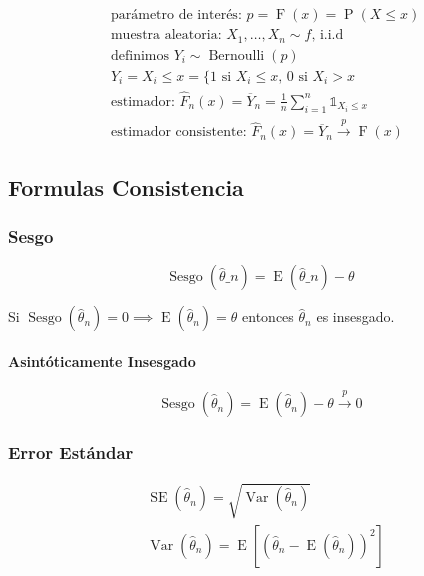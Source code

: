 \documentclass[
]{article}
\begin{document}
\[
\begin{align*}
    & \text{parámetro de interés: } p = \operatorname{F}(x) = \operatorname{P}(X \leq x) \\
    & \text{muestra aleatoria: } X_1, \dots, X_n \sim f \text{, i.i.d} \\
    & \text{definimos } Y_i \sim \operatorname{Bernoulli}(p) \\
    & Y_i = X_i \leq x = \{1 \text{ si } X_i \leq x \text{, } 0 \text{ si } X_i > x \\
    & \text{estimador: } \hat{F}_n(x) = \overline{Y}_{n} = \frac{1}{n} \sum_{i=1}^n \mathbb{1}_{X_i \leq x} \\
    & \text{estimador consistente: }\hat{F}_n(x) = \overline{Y}_{n} \xrightarrow{p} \operatorname{F}(x)
\end{align*}
\]

\hypertarget{formulas-consistencia}{%
\subsection{Formulas Consistencia}\label{formulas-consistencia}}

\hypertarget{sesgo}{%
\subsubsection{Sesgo}\label{sesgo}}

\[
  \operatorname{Sesgo}(\hat{\theta}\_n) = \operatorname{E}(\hat{\theta}\_n) - \theta 
\]

Si
\(\operatorname{Sesgo}(\hat{\theta}_n) = 0 \implies \operatorname{E}(\hat{\theta}_n) = \theta\)
entonces \(\hat{\theta}_n\) es insesgado.

\hypertarget{asintuxf3ticamente-insesgado}{%
\paragraph{Asintóticamente
Insesgado}\label{asintuxf3ticamente-insesgado}}

\[
    \operatorname{Sesgo}(\hat{\theta}_n) = \operatorname{E}(\hat{\theta}_n) - \theta \xrightarrow{p} 0
\]

\hypertarget{error-estuxe1ndar}{%
\subsubsection{Error Estándar}\label{error-estuxe1ndar}}

\[
\begin{align*}
    & \operatorname{SE}(\hat{\theta}_n) = \sqrt{\operatorname{Var}(\hat{\theta}_n)}\\
    & \operatorname{Var}(\hat{\theta}_n) = \operatorname{E}[(\hat{\theta}_n - \operatorname{E}(\hat{\theta}_n))^2]
\end{align*}
\]
\end{document}
